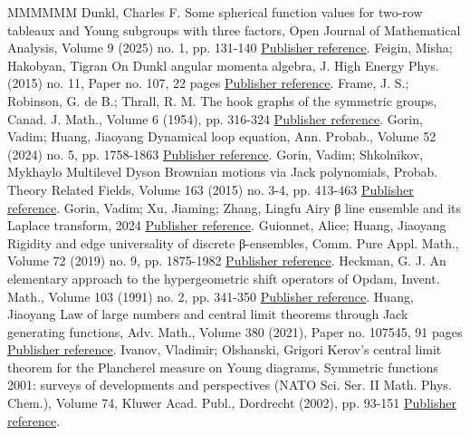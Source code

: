 \begin{thebibliography}{MMMMMM}
 Dunkl, Charles F. Some spherical function values for two-row tableaux and Young subgroups with three factors, Open Journal of Mathematical Analysis, Volume 9 (2025) no. 1, pp. 131-140 \href{https://alco.centre-mersenne.org/articles/10.5802/alco.451/#Dun25b}{Publisher reference}.
 Feigin, Misha; Hakobyan, Tigran On Dunkl angular momenta algebra, J. High Energy Phys. (2015) no. 11, Paper no. 107, 22 pages \href{https://alco.centre-mersenne.org/articles/10.5802/alco.451/#feigin2015dunkl}{Publisher reference}.
 Frame, J. S.; Robinson, G. de B.; Thrall, R. M. The hook graphs of the symmetric groups, Canad. J. Math., Volume 6 (1954), pp. 316-324 \href{https://alco.centre-mersenne.org/articles/10.5802/alco.451/#frame1954hook}{Publisher reference}.
 Gorin, Vadim; Huang, Jiaoyang Dynamical loop equation, Ann. Probab., Volume 52 (2024) no. 5, pp. 1758-1863 \href{https://alco.centre-mersenne.org/articles/10.5802/alco.451/#gorin2024dynamical}{Publisher reference}.
 Gorin, Vadim; Shkolnikov, Mykhaylo Multilevel Dyson Brownian motions via Jack polynomials, Probab. Theory Related Fields, Volume 163 (2015) no. 3-4, pp. 413-463 \href{https://alco.centre-mersenne.org/articles/10.5802/alco.451/#gorin2015multilevel}{Publisher reference}.
 Gorin, Vadim; Xu, Jiaming; Zhang, Lingfu Airy β  line ensemble and its Laplace transform, 2024 \href{https://alco.centre-mersenne.org/articles/10.5802/alco.451/#GXZ2024}{Publisher reference}.
 Guionnet, Alice; Huang, Jiaoyang Rigidity and edge universality of discrete β-ensembles, Comm. Pure Appl. Math., Volume 72 (2019) no. 9, pp. 1875-1982 \href{https://alco.centre-mersenne.org/articles/10.5802/alco.451/#guionnet2019rigidity}{Publisher reference}.
 Heckman, G. J. An elementary approach to the hypergeometric shift operators of Opdam, Invent. Math., Volume 103 (1991) no. 2, pp. 341-350 \href{https://alco.centre-mersenne.org/articles/10.5802/alco.451/#heckman1991elementary}{Publisher reference}.
 Huang, Jiaoyang Law of large numbers and central limit theorems through Jack generating functions, Adv. Math., Volume 380 (2021), Paper no. 107545, 91 pages \href{https://alco.centre-mersenne.org/articles/10.5802/alco.451/#huang2021law}{Publisher reference}.
 Ivanov, Vladimir; Olshanski, Grigori Kerov’s central limit theorem for the Plancherel measure on Young diagrams, Symmetric functions 2001: surveys of developments and perspectives (NATO Sci. Ser. II Math. Phys. Chem.), Volume 74, Kluwer Acad. Publ., Dordrecht (2002), pp. 93-151 \href{https://alco.centre-mersenne.org/articles/10.5802/alco.451/#ivanov2002kerov}{Publisher reference}.

\end{thebibliography}
